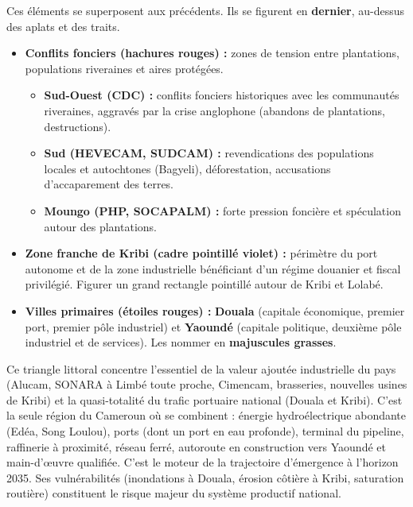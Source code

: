 \documentclass[11pt]{article}
\begin{document}
Ces éléments se superposent aux précédents. Ils se figurent en \textbf{dernier}, au-dessus des aplats et des traits.

\begin{itemize}
    \item \textbf{Conflits fonciers (hachures rouges) :} zones de tension entre plantations, populations riveraines et aires protégées.
        \begin{itemize}
            \item \textbf{Sud-Ouest (CDC) :} conflits fonciers historiques avec les communautés riveraines, aggravés par la crise anglophone (abandons de plantations, destructions).
            \item \textbf{Sud (HEVECAM, SUDCAM) :} revendications des populations locales et autochtones (Bagyeli), déforestation, accusations d'accaparement des terres.
            \item \textbf{Moungo (PHP, SOCAPALM) :} forte pression foncière et spéculation autour des plantations.
        \end{itemize}
    \item \textbf{Zone franche de Kribi (cadre pointillé violet) :} périmètre du port autonome et de la zone industrielle bénéficiant d'un régime douanier et fiscal privilégié. Figurer un grand rectangle pointillé autour de Kribi et Lolabé.
    \item \textbf{Villes primaires (étoiles rouges) :} \textbf{Douala} (capitale économique, premier port, premier pôle industriel) et \textbf{Yaoundé} (capitale politique, deuxième pôle industriel et de services). Les nommer en \textbf{majuscules grasses}.
\end{itemize}

\begin{savaistu}
Ce triangle littoral concentre l'essentiel de la valeur ajoutée industrielle du pays (Alucam, SONARA à Limbé toute proche, Cimencam, brasseries, nouvelles usines de Kribi) et la quasi-totalité du trafic portuaire national (Douala et Kribi). C'est la seule région du Cameroun où se combinent : énergie hydroélectrique abondante (Edéa, Song Loulou), ports (dont un port en eau profonde), terminal du pipeline, raffinerie à proximité, réseau ferré, autoroute en construction vers Yaoundé et main-d'œuvre qualifiée. C'est le moteur de la trajectoire d'émergence à l'horizon 2035. Ses vulnérabilités (inondations à Douala, érosion côtière à Kribi, saturation routière) constituent le risque majeur du système productif national.
\end{savaistu}
\end{document}
